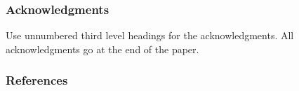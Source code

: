 \documentclass{article}
\newcommand{\GNP}[1][\psi]{{#1}_{\Theta}}
\begin{document}

\subsubsection*{Acknowledgments}

Use unnumbered third level headings for the acknowledgments. All
acknowledgments go at the end of the paper.

\subsubsection*{References}
\end{document}
